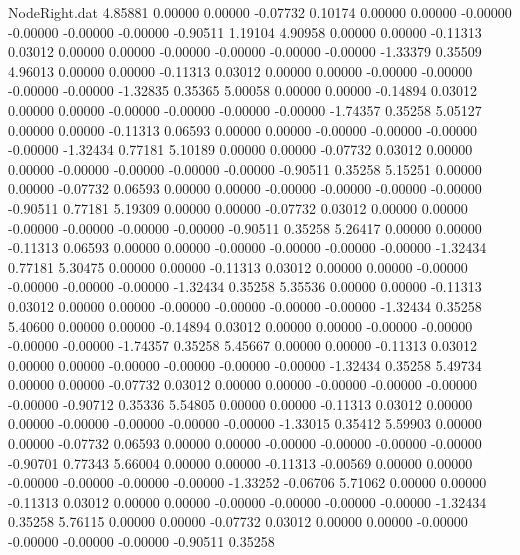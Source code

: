 \begin{filecontents}{NodeRight.dat}
   4.85881    0.00000    0.00000    -0.07732    0.10174    0.00000    0.00000   -0.00000   -0.00000   -0.00000   -0.00000   -0.90511    1.19104
   4.90958    0.00000    0.00000    -0.11313    0.03012    0.00000    0.00000   -0.00000   -0.00000   -0.00000   -0.00000   -1.33379    0.35509
   4.96013    0.00000    0.00000    -0.11313    0.03012    0.00000    0.00000   -0.00000   -0.00000   -0.00000   -0.00000   -1.32835    0.35365
   5.00058    0.00000    0.00000    -0.14894    0.03012    0.00000    0.00000   -0.00000   -0.00000   -0.00000   -0.00000   -1.74357    0.35258
   5.05127    0.00000    0.00000    -0.11313    0.06593    0.00000    0.00000   -0.00000   -0.00000   -0.00000   -0.00000   -1.32434    0.77181
   5.10189    0.00000    0.00000    -0.07732    0.03012    0.00000    0.00000   -0.00000   -0.00000   -0.00000   -0.00000   -0.90511    0.35258
   5.15251    0.00000    0.00000    -0.07732    0.06593    0.00000    0.00000   -0.00000   -0.00000   -0.00000   -0.00000   -0.90511    0.77181
   5.19309    0.00000    0.00000    -0.07732    0.03012    0.00000    0.00000   -0.00000   -0.00000   -0.00000   -0.00000   -0.90511    0.35258
   5.26417    0.00000    0.00000    -0.11313    0.06593    0.00000    0.00000   -0.00000   -0.00000   -0.00000   -0.00000   -1.32434    0.77181
   5.30475    0.00000    0.00000    -0.11313    0.03012    0.00000    0.00000   -0.00000   -0.00000   -0.00000   -0.00000   -1.32434    0.35258
   5.35536    0.00000    0.00000    -0.11313    0.03012    0.00000    0.00000   -0.00000   -0.00000   -0.00000   -0.00000   -1.32434    0.35258
   5.40600    0.00000    0.00000    -0.14894    0.03012    0.00000    0.00000   -0.00000   -0.00000   -0.00000   -0.00000   -1.74357    0.35258
   5.45667    0.00000    0.00000    -0.11313    0.03012    0.00000    0.00000   -0.00000   -0.00000   -0.00000   -0.00000   -1.32434    0.35258
   5.49734    0.00000    0.00000    -0.07732    0.03012    0.00000    0.00000   -0.00000   -0.00000   -0.00000   -0.00000   -0.90712    0.35336
   5.54805    0.00000    0.00000    -0.11313    0.03012    0.00000    0.00000   -0.00000   -0.00000   -0.00000   -0.00000   -1.33015    0.35412
   5.59903    0.00000    0.00000    -0.07732    0.06593    0.00000    0.00000   -0.00000   -0.00000   -0.00000   -0.00000   -0.90701    0.77343
   5.66004    0.00000    0.00000    -0.11313   -0.00569    0.00000    0.00000   -0.00000   -0.00000   -0.00000   -0.00000   -1.33252   -0.06706
   5.71062    0.00000    0.00000    -0.11313    0.03012    0.00000    0.00000   -0.00000   -0.00000   -0.00000   -0.00000   -1.32434    0.35258
   5.76115    0.00000    0.00000    -0.07732    0.03012    0.00000    0.00000   -0.00000   -0.00000   -0.00000   -0.00000   -0.90511    0.35258

\end{filecontents}
